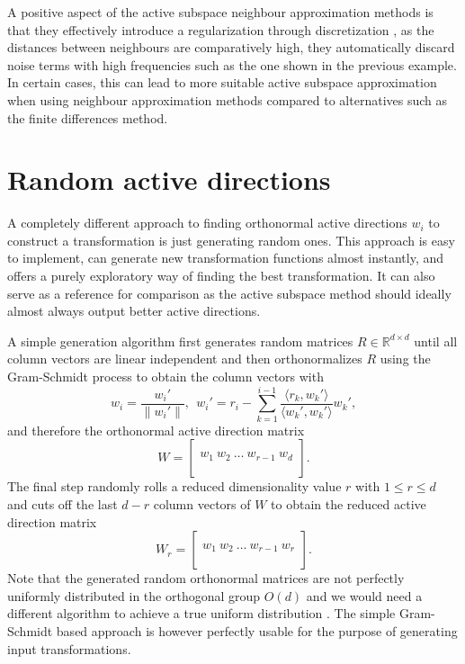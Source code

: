 \documentclass[
  a4paper,  %
  twoside,  %
  bibliography=totoc,
  headsepline,
  cleardoublepage=empty,
  parskip=half,
  draft=false
]{scrbook}
\begin{document}
A positive aspect of the active subspace neighbour approximation methods is that they effectively introduce a regularization through discretization \cite{Kress1999}, \ie as the distances between neighbours are comparatively high, they automatically discard noise terms with high frequencies such as the one shown in the previous example.
In certain cases, this can lead to more suitable active subspace approximation when using neighbour approximation methods compared to alternatives such as the finite differences method.

\section{Random active directions}
\label{sec:rt}

A completely different approach to finding orthonormal active directions $w_i$ to construct a transformation is just generating random ones.
This approach is easy to implement, can generate new transformation functions almost instantly, and offers a purely exploratory way of finding the best transformation.
It can also serve as a reference for comparison as the active subspace method should ideally almost always output better active directions.

A simple generation algorithm first generates random matrices $R \in \mathds{R}^{d \times d}$ until all column vectors are linear independent and then orthonormalizes $R$ using the Gram-Schmidt process to obtain the column vectors with
\begin{equation}
w_i=\frac{w_i'}{\| w_i' \|},~~ w_i'=r_i - \sum_{k=1}^{i-1} \frac{\langle r_k,  w_k' \rangle}{\langle w_k', w_k' \rangle} w_k',
\end{equation}
and therefore the orthonormal active direction matrix
\begin{equation}
W = \begin{bmatrix}
  \\
    w_1 ~ w_2 ~ \dots ~ w_{r-1} ~ w_d\\
    \\
  \end{bmatrix}.
\end{equation}
%
The final step randomly rolls a reduced dimensionality value $r$ with $1 \leq r \leq d$ and cuts off the last $d-r$ column vectors of $W$ to obtain the reduced active direction matrix
\begin{equation}
W_r = \begin{bmatrix}
  \\
    w_1 ~ w_2 ~ \dots ~ w_{r-1} ~ w_r\\
    \\
  \end{bmatrix}.
\end{equation}
%
Note that the generated random orthonormal matrices are not perfectly uniformly distributed in the orthogonal group $O(d)$ and we would need a different algorithm to achieve a true uniform distribution \cite{Wang2008}.
The simple Gram-Schmidt based approach is however perfectly usable for the purpose of generating input transformations.
\end{document}
